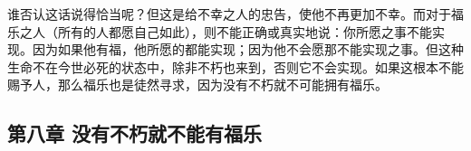 \par

谁否认这话说得恰当呢？但这是给不幸之人的忠告，使他不再更加不幸。而对于福乐之人（所有的人都愿自己如此），则不能正确或真实地说：你所愿之事不能实现。因为如果他有福，他所愿的都能实现；因为他不会愿那不能实现之事。但这种生命不在今世必死的状态中，除非不朽也来到，否则它不会实现。如果这根本不能赐予人，那么福乐也是徒然寻求，因为没有不朽就不可能拥有福乐。\par


\subsection{第八章 没有不朽就不能有福乐}

